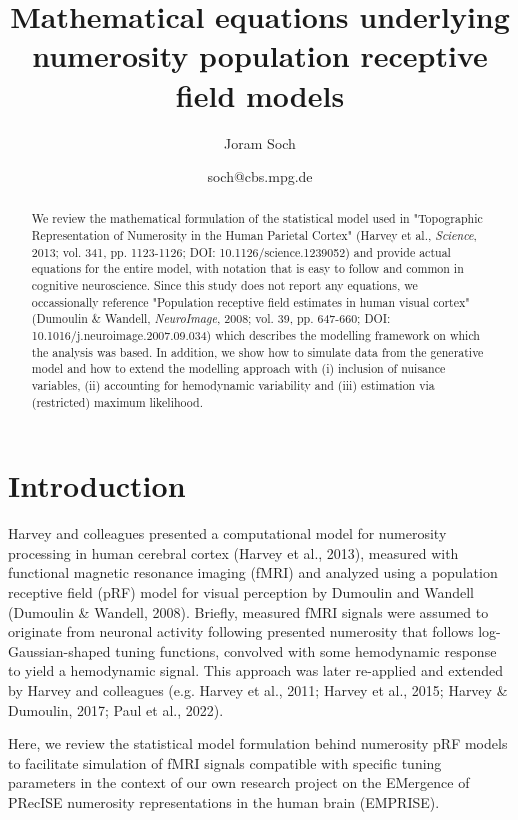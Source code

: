 \documentclass[a4paper,12pt]{article}
\title{Mathematical equations underlying \\ numerosity population receptive field models}
\author{Joram Soch}
\date{soch@cbs.mpg.de}
\begin{document}
	

\maketitle


\begin{abstract}
\noindent
We review the mathematical formulation of the statistical model used in "Topographic Representation of Numerosity in the Human Parietal Cortex" (Harvey et al., \textit{Science}, 2013; vol. 341, pp. 1123-1126; DOI: 10.1126/science.1239052) and provide actual equations for the entire model, with notation that is easy to follow and common in cognitive neuroscience. Since this study does not report any equations, we occassionally reference "Population receptive field estimates in human visual cortex" (Dumoulin \& Wandell, \textit{NeuroImage}, 2008; vol. 39, pp. 647-660; DOI: 10.1016/j.neuroimage.2007.09.034) which describes the modelling framework on which the analysis was based. In addition, we show how to simulate data from the generative model and how to extend the modelling approach with (i) inclusion of nuisance variables, (ii) accounting for hemodynamic variability and (iii) estimation via (restricted) maximum likelihood.
\end{abstract}


\pagebreak
\tableofcontents


\pagebreak
{}
\section{Introduction} \label{sec:Intro}

Harvey and colleagues presented a computational model for numerosity processing in human cerebral cortex (Harvey et al., 2013), measured with functional magnetic resonance imaging (fMRI) and analyzed using a population receptive field (pRF) model for visual perception by Dumoulin and Wandell (Dumoulin \& Wandell, 2008). Briefly, measured fMRI signals were assumed to originate from neuronal activity following presented numerosity that follows log-Gaussian-shaped tuning functions, convolved with some hemodynamic response to yield a hemodynamic signal. This approach was later re-applied and extended by Harvey and colleagues (e.g. Harvey et al., 2011; Harvey et al., 2015; Harvey \& Dumoulin, 2017; Paul et al., 2022).

Here, we review the statistical model formulation behind numerosity pRF models to facilitate simulation of fMRI signals compatible with specific tuning parameters in the context of our own research project on the EMergence of PRecISE numerosity representations in the human brain (EMPRISE).
\end{document}
